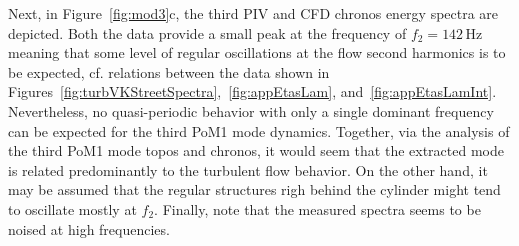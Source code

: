 {{Next}, in Figure~\ref{fig:mod3}c, the third PIV and CFD chronos energy spectra are depicted. Both the data provide {a} small peak at {the} frequency {of} $f_2 = 142\,$Hz {meaning that some level of regular oscillations at the flow second harmonics is to be expected, cf. relations between the data shown in Figures~\ref{fig:turbVKStreetSpectra},~\ref{fig:appEtasLam}, and~\ref{fig:appEtasLamInt}. Nevertheless, no quasi-periodic behavior with only a single dominant frequency can be expected for the third PoM1 mode dynamics. Together, via the analysis of the third PoM1 mode  topos and chronos, it would seem that the extracted mode is related predominantly to the turbulent flow behavior. On the other hand, it may be assumed that the regular structures righ behind the cylinder might tend to oscillate mostly at $f_{2}$. Finally, note that } the measured spectra seems to be noised at high frequencies.



}
